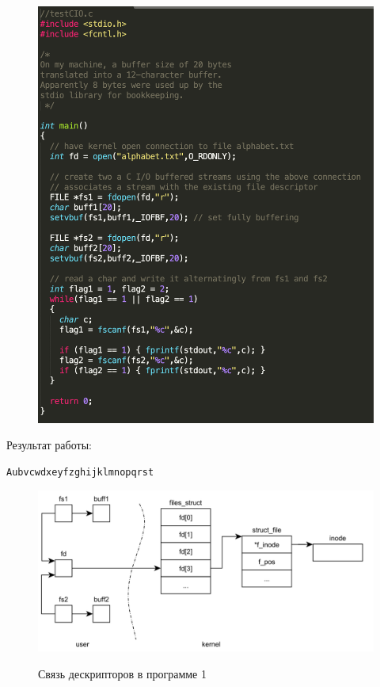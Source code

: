 \documentclass[a4paper,12pt]{article}
\begin{document}
	\begin{figure}[h!]
		\begin{center}
			{\includegraphics[scale = 0.7]{testCIO.png}}
			\label{ris:testCIO}
		\end{center}
	\end{figure}
	
	Результат работы:
	
	\begin{lstlisting}[label = lst1, caption =  Результат testCIO.out]
	Aubvcwdxeyfzghijklmnopqrst
	\end{lstlisting}
	
	\newpage
	
	\begin{figure}[h!]
		\begin{center}
			{\includegraphics[scale = 0.7]{page1.png}}
			\label{ris:page1}
		\end{center}
		\caption{Связь дескрипторов в программе 1}
	\end{figure}
	
\end{document}
